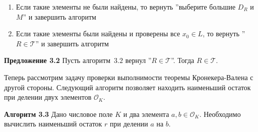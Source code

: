 \documentclass[_00_autoref.tex]{subfiles}
\begin{document}
\begin{enumerate}
\begin{enumerate}
            \item Если такие элементы не были найдены, то вернуть ''выберите большие $D_R$ и $M$'' и завершить алгоритм
            
            \item Если такие элементы были найдены и проверены все $x_0 \in L$, то вернуть ''$R \in \mathcal{T}$'' и завершить алгоритм
        \end{enumerate}
    \end{enumerate}

\textbf{Предложение 3.2}
    Пусть алгоритм~$3.2$ вернул ''$R \in \mathcal{T}$''.
    Тогда $R \in \mathcal{T}$.



Теперь рассмотрим задачу проверки выполнимости теоремы Кронекера-Валена с другой стороны.
Следующий алгоритм позволяет находить наименьший остаток при делении двух элементов $\mathcal{O}_K$.

\textbf{Алгоритм 3.3}\label{algorithm:least_norm_remainder}
    Дано числовое поле $K$ и два элемента $a, b \in \mathcal{O}_K$.
    Необходимо вычислить наименьший остаток $r$ при делении $a$ на $b$.
\end{document}
